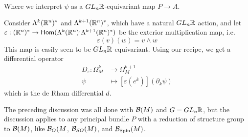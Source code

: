 Where we interpret $\psi$ as a $GL_n\mathbb{R}$-equivariant map $P \to A$.
%
\begin{exmp}
Consider $\Lambda^k(\mathbb{R}^n)^*$ and $\Lambda^{k+1}(\mathbb{R}^n)^*$, which have a natural
$GL_n\mathbb{R}$ action, and let
$\varepsilon : (\mathbb{R}^n)^* \to \mathsf{Hom}(\Lambda^k(\mathbb{R}^n)^,\Lambda^{k+1}(\mathbb{R}^n)^*)$
be the exterior multiplication map, i.e.
\[
\varepsilon(v)(w) = v \wedge w
\]
This map is easily seen to be $GL_n\mathbb{R}$-equivariant. Using our recipe, we get a
differential operator
\begin{align*}
D_\varepsilon : \Omega^k_M &\to \Omega^{k+1}_M \\
\psi &\mapsto [\varepsilon(e^k)](\partial_k\psi)
\end{align*}
which is the de Rham differential $d$.
\end{exmp}
%
The preceding discussion was all done with $\mathcal{B}(M)$ and $G = GL_n\mathbb{R}$, but the
discussion applies to any principal bundle $P$ with a reduction of structure
group to $\mathcal{B}(M)$, like $\mathcal{B}_O(M$, $\mathcal{B}_{SO}(M)$, and $\mathcal{B}_{\mathrm{Spin}}(M)$. \\
%

